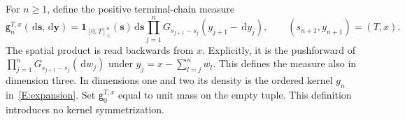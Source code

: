 \documentclass[12pt,oneside,openany]{book}
\makeatletter
\let\lean@pending\@empty
\newcommand{\LeanMarker}[1]{\gdef\lean@pending{#1}}
\numberwithin{equation}{section}
\theoremstyle{nogostyle}
\theoremstyle{definition}
\newcommand{\ud}{\,\mathrm{d}}
\makeatother
\begin{document}
For $n \ge 1$, define the positive terminal-chain measure
\begin{equation}\label{E:terminal-chain-measure}
  \mathsf{g}_n^{T,x}(\ud\boldsymbol s,\ud\boldsymbol y)
  =\mathbf1_{[0,T]^n_<}(\boldsymbol s)\ud\boldsymbol s
  \prod_{j=1}^n
  G_{s_{j+1}-s_j}(y_{j+1}-\ud y_j),
  \qquad (s_{n+1},y_{n+1})=(T,x).
\end{equation}
The spatial product is read backwards from $x$. Explicitly, it is the
pushforward of $\prod_{j=1}^nG_{s_{j+1}-s_j}(\ud w_j)$ under $y_j =
x-\sum_{l=j}^n w_l$. This defines the measure also in dimension three. In
dimensions one and two its density is the ordered kernel $g_n$
in~\eqref{E:expansion}. Set $\mathsf{g}_0^{T,x}$ equal to unit mass on the empty
tuple. This definition introduces no kernel symmetrization.

\LeanMarker{L:terminal-wick}
\end{document}
